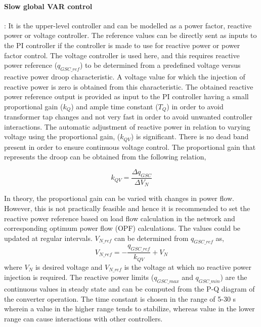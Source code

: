 \paragraph{Slow global VAR control}:
It is the upper-level controller and can be modelled as a power factor, reactive power or voltage controller. The reference values can be directly sent as inputs to the \gls{PI} controller if the controller is made to use for reactive power or power factor control. The voltage controller is used here, and this requires reactive power reference ($q_{GSC\_ref}$) to be determined from a predefined voltage versus reactive power droop characteristic. A voltage value for which the injection of reactive power is zero is obtained from this characteristic. The obtained reactive power reference output is provided as input to the \gls{PI} controller having a small proportional gain ($k_Q$) and ample time constant ($T_Q$) in order to avoid transformer tap changes and not very fast in order to avoid unwanted controller interactions. The automatic adjustment of reactive power in relation to varying voltage using the proportional gain, ($k_{QV}$) is significant. There is no dead band present in order to ensure continuous voltage control. The  proportional gain that represents the droop can be obtained from the following relation,

\begin{equation}
    k_{QV} = \frac{\Delta q_{GSC}}{\Delta V_N}
\end{equation}

In theory, the proportional gain can be varied with changes in power flow. However, this is not practically feasible and hence it is recommended to set the reactive power reference based on load flow calculation in the network and corresponding optimum power flow (OPF) calculations. The values could be updated at regular intervals. $V_{N\_{ref}}$ can be determined from $q_{GSC\_ref}$ as,
\begin{equation}
    V_{N\_{ref}} = -\frac{q_{GSC\_ref}}{k_{QV}} + V_N
\end{equation}
where $V_N$ is desired voltage and $V_{N\_{ref}}$ is the voltage at which no reactive power injection is required.
The reactive power limits ($q_{GSC\_max}$ and $q_{GSC\_min}$) are the continuous values in steady state and can be computed from the P-Q diagram of the converter operation. The time constant is chosen in the range of 5-30 s wherein a value in the higher range tends to stabilize, whereas value in the lower range can cause interactions with other controllers.

